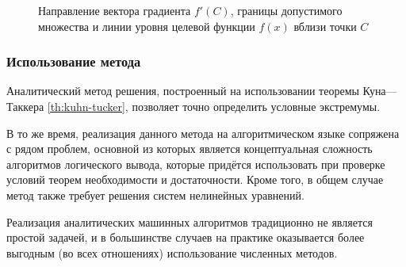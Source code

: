 \begin{itemize}
\begin{figure}[!h]
    \caption[Задача \eqref{eq:cond-optim-problem} вблизи
    $C$]{Направление вектора градиента $f'(C)$, границы допустимого
      множества и линии уровня целевой функции $f(x)$ вблизи точки
      $C$}
    \label{fig:cond-optim-zoom}
  \end{figure}
\end{itemize}

\subsubsection{Использование метода}

Аналитический метод решения, построенный на использовании теоремы
Куна—Таккера \ref{th:kuhn-tucker}, позволяет точно определить условные
экстремумы.

В то же время, реализация данного метода на алгоритмическом языке
сопряжена с рядом проблем, основной из которых является концептуальная
сложность алгоритмов логического вывода, которые придётся использовать
при проверке условий теорем необходимости и достаточности. Кроме того,
в общем случае метод также требует решения систем нелинейных
уравнений.

Реализация аналитических машинных алгоритмов традиционно не является
простой задачей, и в большинстве случаев на практике оказывается более
выгодным (во всех отношениях) использование численных методов.
